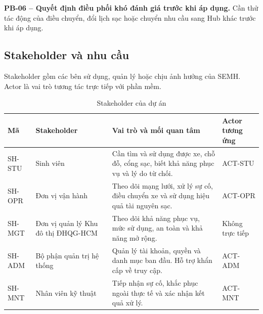 \medskip
\noindent\textbf{PB-06 -- Quyết định điều phối khó đánh giá trước khi áp dụng.} Cần thử tác động của điều chuyển, đổi lịch sạc hoặc chuyển nhu cầu sang Hub khác trước khi áp dụng.

\subsection{Stakeholder và nhu cầu}

Stakeholder gồm các bên sử dụng, quản lý hoặc chịu ảnh hưởng của SEMH. Actor là vai trò tương tác trực tiếp với phần mềm.

\begin{table}[H]
  \centering
  \caption{Stakeholder của dự án}
  \label{tab:stakeholders}
  \small
  \begin{tabularx}{\textwidth}{|L{20mm}|L{34mm}|Y|L{29mm}|}
    \hline
    \textbf{Mã} & \centering\arraybackslash\textbf{Stakeholder} & \centering\arraybackslash\textbf{Vai trò và mối quan tâm} & \centering\arraybackslash\textbf{Actor tương ứng}\\
    \hline
    SH-STU & Sinh viên & Cần tìm và sử dụng được xe, chỗ đỗ, cổng sạc, biết khả năng phục vụ và lý do từ chối. & ACT-STU\\
    \hline
    SH-OPR & Đơn vị vận hành & Theo dõi mạng lưới, xử lý sự cố, điều chuyển xe và sử dụng hiệu quả tài nguyên sạc. & ACT-OPR\\
    \hline
    SH-MGT & Đơn vị quản lý Khu đô thị ĐHQG-HCM & Theo dõi khả năng phục vụ, mức sử dụng, an toàn và khả năng mở rộng. & Không trực tiếp\\
    \hline
    SH-ADM & Bộ phận quản trị hệ thống & Quản lý tài khoản, quyền và danh mục ban đầu. Hỗ trợ khẩn cấp về truy cập. & ACT-ADM\\
    \hline
    SH-MNT & Nhân viên kỹ thuật & Tiếp nhận sự cố, khắc phục ngoài thực tế và xác nhận kết quả xử lý. & ACT-MNT\\
    \hline
  \end{tabularx}
\end{table}

